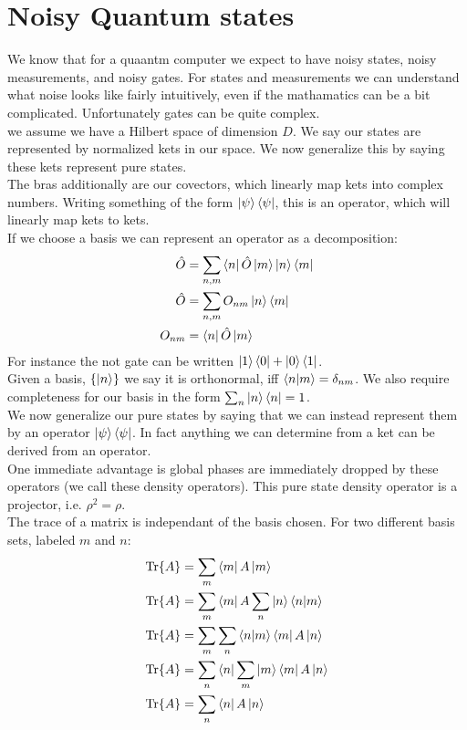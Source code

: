 \section{Noisy Quantum states}
We know that for a quaantm computer we expect to have noisy states, noisy measurements, and noisy gates. For states and measurements we can understand what noise looks like fairly intuitively, even if the mathamatics can be a bit complicated. Unfortunately gates can be quite complex. \\
we assume we have a Hilbert space of dimension $D$. We say our states are represented by normalized kets in our space. We now generalize this by saying these kets represent pure states. \\
The bras additionally are our covectors, which linearly map kets into complex numbers. Writing something of the form $\ket{\psi}\bra{\psi}$, this is an operator, which will linearly map kets to kets.\\
If we choose a basis we can represent an operator as a decomposition:
\begin{align*}
	\hat{O} &= \sum_{n,m} \bra{n}\hat{O}\ket{m} \ket{n}\bra{m} \\
	\hat{O} &= \sum_{n,m} O_{nm}\ket{n}\bra{m} \\
	O_{nm} &= \bra{n}\hat{O}\ket{m}
\end{align*}
For instance the not gate can be written $\ket{1}\bra{0} + \ket{0}\bra{1}$. \\
Given a basis, $\{\ket{n}\}$ we say it is orthonormal, iff $\bra{n}\ket{m} = \delta_{nm}$. We also require completeness for our basis in the form $\sum_n \ket{n}\bra{n} = 1$.\\
We now generalize our pure states by saying that we can instead represent them by an operator $\ket{\psi}\bra{\psi}$. In fact anything we can determine from a ket can be derived from an operator.\\
One immediate advantage is global phases are immediately dropped by these operators (we call these density operators). This pure state density operator is a projector, i.e. $\rho^2 = \rho$. \\
The trace of a matrix is independant of the basis chosen. For two different basis sets, labeled $m$ and $n$:
\begin{align*}
	\Tr{A} &= \sum_m \bra{m}A\ket{m} \\
	\Tr{A} &= \sum_m \bra{m}A\sum_n \ket{n}\bra{n}\ket{m} \\
	\Tr{A} &= \sum_m\sum_n \bra{n}\ket{m}\bra{m}A \ket{n} \\
	\Tr{A} &= \sum_n \bra{n}\sum_m\ket{m}\bra{m}A \ket{n} \\
	\Tr{A} &= \sum_n \bra{n}A \ket{n}
\end{align*}
